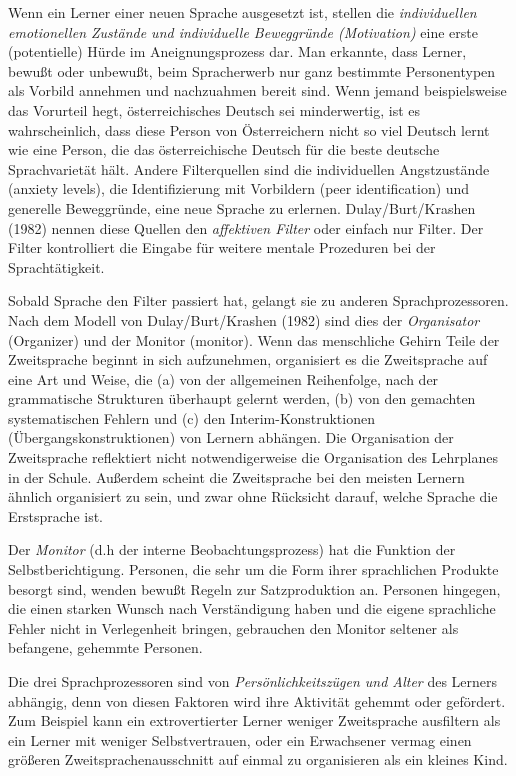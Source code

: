 \documentclass[
  letterpaper,
]{scrbook}
\begin{document}
Wenn ein Lerner einer neuen Sprache ausgesetzt ist, stellen die
\emph{individuellen emotionellen Zustände und individuelle Beweggründe
(Motivation)} eine erste (potentielle) Hürde im Aneignungsprozess dar.
Man erkannte, dass Lerner, bewußt oder unbewußt, beim Spracherwerb nur
ganz bestimmte Personentypen als Vorbild annehmen und nachzuahmen bereit
sind. Wenn jemand beispielsweise das Vorurteil hegt, österreichisches
Deutsch sei minderwertig, ist es wahrscheinlich, dass diese Person von
Österreichern nicht so viel Deutsch lernt wie eine Person, die das
österreichische Deutsch für die beste deutsche Sprachvarietät hält.
Andere Filterquellen sind die individuellen Angstzustände (anxiety
levels), die Identifizierung mit Vorbildern (peer identification) und
generelle Beweggründe, eine neue Sprache zu erlernen. Dulay/Burt/Krashen
(1982) nennen diese Quellen den \emph{affektiven Filter} oder einfach
nur Filter. Der Filter kontrolliert die Eingabe für weitere mentale
Prozeduren bei der Sprachtätigkeit.

Sobald Sprache den Filter passiert hat, gelangt sie zu anderen
Sprachprozessoren. Nach dem Modell von Dulay/Burt/Krashen (1982) sind
dies der \emph{Organisator} (Organizer) und der Monitor (monitor). Wenn
das menschliche Gehirn Teile der Zweitsprache beginnt in sich
aufzunehmen, organisiert es die Zweitsprache auf eine Art und Weise, die
(a) von der allgemeinen Reihenfolge, nach der grammatische Strukturen
überhaupt gelernt werden, (b) von den gemachten systematischen Fehlern
und (c) den Interim-Konstruktionen (Übergangskonstruktionen) von Lernern
abhängen. Die Organisation der Zweitsprache reflektiert nicht
notwendigerweise die Organisation des Lehrplanes in der Schule. Außerdem
scheint die Zweitsprache bei den meisten Lernern ähnlich organisiert zu
sein, und zwar ohne Rücksicht darauf, welche Sprache die Erstsprache
ist.

Der \emph{Monitor} (d.h der interne Beobachtungsprozess) hat die
Funktion der Selbstberichtigung. Personen, die sehr um die Form ihrer
sprachlichen Produkte besorgt sind, wenden bewußt Regeln zur
Satzproduktion an. Personen hingegen, die einen starken Wunsch nach
Verständigung haben und die eigene sprachliche Fehler nicht in
Verlegenheit bringen, gebrauchen den Monitor seltener als befangene,
gehemmte Personen.

Die drei Sprachprozessoren sind von \emph{Persönlichkeitszügen und
Alter} des Lerners abhängig, denn von diesen Faktoren wird ihre
Aktivität gehemmt oder gefördert. Zum Beispiel kann ein extrovertierter
Lerner weniger Zweitsprache ausfiltern als ein Lerner mit weniger
Selbstvertrauen, oder ein Erwachsener vermag einen größeren
Zweitsprachenausschnitt auf einmal zu organisieren als ein kleines Kind.
\end{document}
